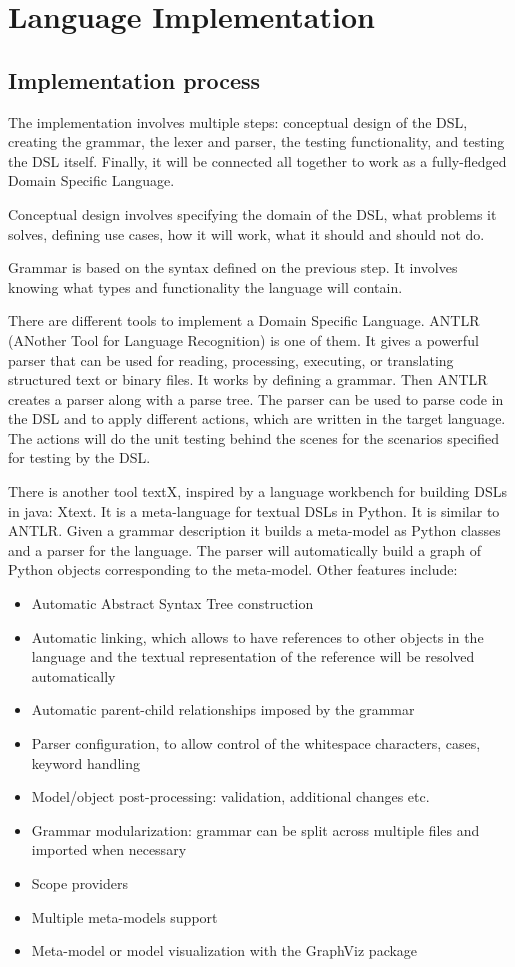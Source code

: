 \chapter{Language Implementation}


\section{Implementation process}

The implementation involves multiple steps: conceptual design of the DSL, creating the grammar, the lexer and parser, the testing functionality, and testing the DSL itself. Finally, it will be connected all together to work as a fully-fledged Domain Specific Language.

Conceptual design involves specifying the domain of the DSL, what problems it solves, defining use cases, how it will work, what it should and should not do.

Grammar is based on the syntax defined on the previous step. It involves knowing what types and functionality the language will contain.

There are different tools to implement a Domain Specific Language. ANTLR (ANother Tool for Language Recognition) is one of them. It gives a powerful parser that can be used for reading, processing, executing, or translating structured text or binary files. It works by defining a grammar. Then ANTLR creates a parser along with a parse tree. The parser can be used to parse code in the DSL and to apply different actions, which are written in the target language. The actions will do the unit testing behind the scenes for the scenarios specified for testing by the DSL.

There is another tool textX, inspired by a language workbench for building DSLs in java: Xtext. It is a meta-language for textual DSLs in Python. It is similar to ANTLR. Given a grammar description it builds a meta-model as Python classes and a parser for the language. The parser will automatically build a graph of Python objects corresponding to the meta-model. Other features include:
\begin{itemize}
    \item Automatic Abstract Syntax Tree construction
    \item Automatic linking, which allows to have references to other objects in the language and the textual representation of the reference will be resolved automatically
    \item Automatic parent-child relationships imposed by the grammar
    \item Parser configuration, to allow control of the whitespace characters, cases, keyword handling
    \item Model/object post-processing: validation, additional changes etc.
    \item Grammar modularization: grammar can be split across multiple files and imported when necessary
    \item Scope providers
    \item Multiple meta-models support
    \item Meta-model or model visualization with the GraphViz package
\end{itemize}

